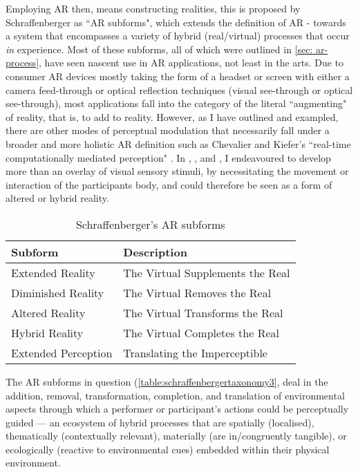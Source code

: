 Employing AR then, means constructing realities, this is proposed by Schraffenberger as ``AR subforms", which extends the definition of AR - towards a system that encompasses a variety of hybrid (real/virtual) processes that occur \textit{in} experience. Most of these subforms, all of which were outlined in \autoref{sec: ar-process}, have seen nascent use in AR applications, not least in the arts. Due to consumer AR devices mostly taking the form of a headset or screen with either a camera feed-through or optical reflection techniques (visual see-through or optical see-through), most applications fall into the category of the literal ``augmenting" of reality, that is, to add to reality. However, as I have outlined and exampled, there are other modes of perceptual modulation that necessarily fall under a broader and more holistic AR definition such as Chevalier and Kiefer's ``real-time computationally mediated perception" \citeyearpar[]{chevalier2020}. In \textit{}, \textit{}, and \textit{}, I endeavoured to develop more than an overlay of visual sensory stimuli, by necessitating the movement or interaction of the participants body, and could therefore be seen as a form of altered or hybrid reality.

\begin{table}
    \centering
    \begin{tabular}{ l l }
        \toprule
        Subform             & Description                       \\
        \midrule
        Extended Reality    & The Virtual Supplements the Real  \\
        Diminished Reality  & The Virtual Removes the Real      \\
        Altered Reality     & The Virtual Transforms the Real   \\
        Hybrid Reality      & The Virtual Completes the Real    \\
        Extended Perception & Translating the Imperceptible     \\
        \bottomrule
    \end{tabular}
    \caption{Schraffenberger's AR subforms}\label{table:schraffenbergertaxonomy3}
\end{table}

The AR subforms in question (\autoref{table:schraffenbergertaxonomy3}, deal in the addition, removal, transformation, completion, and translation of environmental aspects through which a performer or participant's actions could be perceptually guided — an ecosystem of hybrid processes that are spatially (localised), thematically (contextually relevant), materially (are in/congruently tangible), or ecologically (reactive to environmental cues) embedded within their physical environment.

